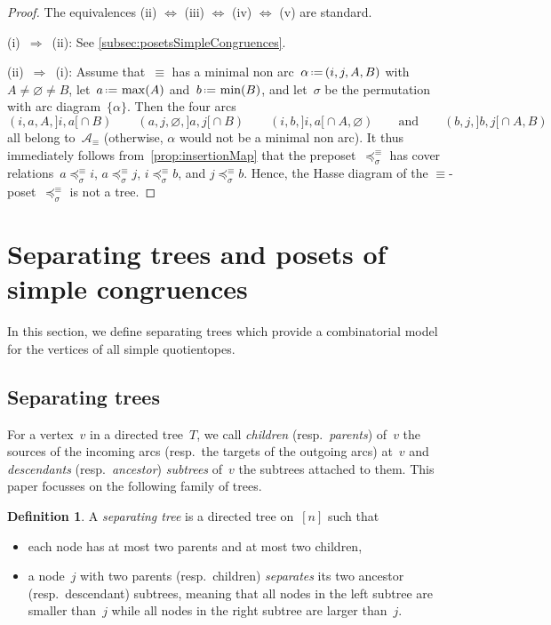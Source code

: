 \documentclass{amsart}
\theoremstyle{definition}
\newtheorem{definition}[theorem]{Definition}
\newcommand{\eqdef}{\mbox{\,\raisebox{0.2ex}{\scriptsize\ensuremath{\mathrm:}}\ensuremath{=}\,}} %
\newcommand{\darkblue}{\color{darkblue}} %
\newcommand{\defn}[1]{\textsl{\darkblue #1}} %
\newcommand{\arcs}{{\mathcal{A}}} %
\begin{document}
\begin{proof}
The equivalences (ii) $\iff$ (iii) $\iff$ (iv) $\iff$ (v) are standard.

(i)~$\Longrightarrow$~(ii): See \cref{subsec:posetsSimpleCongruences}.

(ii)~$\Longrightarrow$~(i): Assume that~$\equiv$ has a minimal non arc~$\alpha \eqdef (i, j, A, B)$ with~$A \ne \varnothing \ne B$, let~$a \eqdef \max(A)$ and~$b \eqdef \min(B)$, and let~$\sigma$ be the permutation with arc diagram~$\{\alpha\}$. Then the four arcs
\[
(i, a, A, {]i,a[} \cap B)
\qquad
(a, j, \varnothing, {]a,j[} \cap B)
\qquad
(i, b, {]i,a[} \cap A, \varnothing)
\qquad\text{and}\qquad
(b, j, {]b,j[} \cap A, B)
\]
all belong to~$\arcs_\equiv$ (otherwise, $\alpha$ would not be a minimal non arc).
It thus immediately follows from~\cref{prop:insertionMap} that the preposet~$\preccurlyeq_\sigma^\equiv$ has cover relations~$a \preccurlyeq_\sigma^\equiv i$, $a \preccurlyeq_\sigma^\equiv j$, $i \preccurlyeq_\sigma^\equiv b$, and $j \preccurlyeq_\sigma^\equiv b$.
Hence, the Hasse diagram of the $\equiv$-poset~$\preccurlyeq_\sigma^\equiv$ is not a tree.
\end{proof}


\section{Separating trees and posets of simple congruences}
\label{sec:separatingTreesPostesSimpleCongruences}

In this section, we define separating trees which provide a combinatorial model for the vertices of all simple quotientopes.


\subsection{Separating trees}
\label{sec:separatingTrees}

For a vertex~$v$ in a directed tree~$T$, we call \defn{children} (resp.~\defn{parents}) of~$v$ the sources of the incoming arcs (resp.~the targets of the outgoing arcs) at~$v$ and \defn{descendants} (resp.~\defn{ancestor}) \defn{subtrees} of~$v$ the subtrees attached to them.
This paper focusses on the following family of trees.

\begin{definition}
\label{def:separatingTree}
A \defn{separating tree} is a directed tree on~$[n]$ such that
\begin{itemize}
\item each node has at most two parents and at most two children,
\item a node~$j$ with two parents (resp.~children) \defn{separates} its two ancestor (resp.~descendant) subtrees, meaning that all nodes in the left subtree are smaller than~$j$ while all nodes in the right subtree are larger than~$j$.
\end{itemize}
\end{definition}
\end{document}
